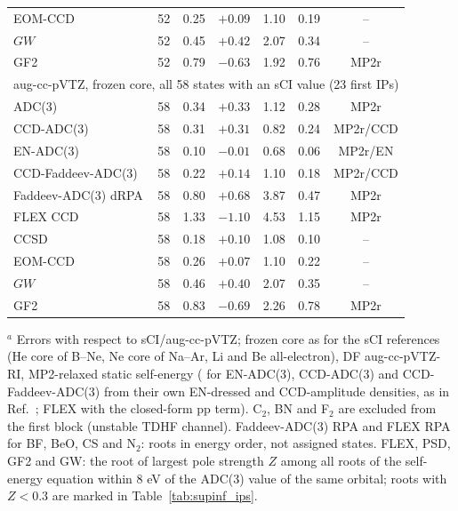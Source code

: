 \begin{table}[hbt!]
\begin{tabular}{lcccccc}
EOM-CCD & 52 & 0.25 & $+0.09$ & 1.10 & 0.19 & -- \\
$GW$ & 52 & 0.45 & $+0.42$ & 2.07 & 0.34 & -- \\
GF2 & 52 & 0.79 & $-0.63$ & 1.92 & 0.76 & MP2r \\
\midrule
\multicolumn{7}{l}{aug-cc-pVTZ, frozen core, all 58 states with an sCI value (23 first IPs)} \\
\midrule
ADC(3) & 58 & 0.34 & $+0.33$ & 1.12 & 0.28 & MP2r \\
CCD-ADC(3) & 58 & 0.31 & $+0.31$ & 0.82 & 0.24 & MP2r/CCD \\
EN-ADC(3) & 58 & 0.10 & $-0.01$ & 0.68 & 0.06 & MP2r/EN \\
CCD-Faddeev-ADC(3) & 58 & 0.22 & $+0.14$ & 1.10 & 0.18 & MP2r/CCD \\
Faddeev-ADC(3) dRPA & 58 & 0.80 & $+0.68$ & 3.87 & 0.47 & MP2r \\
FLEX CCD & 58 & 1.33 & $-1.10$ & 4.53 & 1.15 & MP2r \\
CCSD & 58 & 0.18 & $+0.10$ & 1.08 & 0.10 & -- \\
EOM-CCD & 58 & 0.26 & $+0.07$ & 1.10 & 0.22 & -- \\
$GW$ & 58 & 0.46 & $+0.40$ & 2.07 & 0.35 & -- \\
GF2 & 58 & 0.83 & $-0.69$ & 2.26 & 0.78 & MP2r \\
\bottomrule
\end{tabular}
\par\smallskip
{\raggedright\footnotesize
$^a$ Errors with respect to sCI/aug-cc-pVTZ; frozen core as for the sCI references\cite{Marie2024} (He core of B--Ne, Ne core of Na--Ar, Li and Be all-electron), DF aug-cc-pVTZ-RI, MP2-relaxed static self-energy ( for EN-ADC(3), CCD-ADC(3) and CCD-Faddeev-ADC(3) from their own EN-dressed and CCD-amplitude densities, as in Ref.~; FLEX with the closed-form pp term). C$_2$, BN and F$_2$ are excluded from the first block (unstable TDHF channel). Faddeev-ADC(3) RPA and FLEX RPA for BF, BeO, CS and N$_2$: roots in energy order, not assigned states. FLEX, PSD, GF2 and GW: the root of largest pole strength $Z$ among all roots of the self-energy equation within 8 eV of the ADC(3) value of the same orbital; roots with $Z<0.3$ are marked in Table~\ref{tab:supinf_ips}.\par
}
\end{table}

